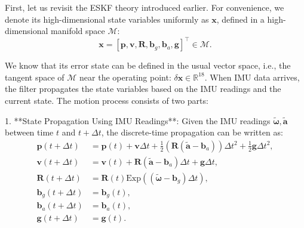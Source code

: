First, let us revisit the ESKF theory introduced earlier. For convenience, we denote its high-dimensional state variables uniformly as $\mathbf{x}$, defined in a high-dimensional manifold space $\mathcal{M}$:  
\begin{equation}\label{eq:def-of-state-variable}  
	\mathbf{x} = [\mathbf{p}, \mathbf{v}, \mathbf{R}, \mathbf{b}_g, \mathbf{b}_a, \mathbf{g}]^\top \in \mathcal{M}.  
\end{equation}  

We know that its error state can be defined in the usual vector space, i.e., the tangent space of $\mathcal{M}$ near the operating point: $\delta \mathbf{x} \in \mathbb{R}^{18}$. When IMU data arrives, the filter propagates the state variables based on the IMU readings and the current state. The motion process consists of two parts:  

1. **State Propagation Using IMU Readings**: Given the IMU readings $\tilde{\boldsymbol{\omega}}, \tilde{\mathbf{a}}$ between time $t$ and $t+\Delta t$, the discrete-time propagation can be written as:  
\begin{subequations}\label{key}  
	\begin{align}  
		\mathbf{p}(t+\Delta t) &= \mathbf{p}(t) + \mathbf{v} \Delta t + \frac{1}{2}   
		\left(\mathbf{R}(\tilde{\mathbf{a}}-\mathbf{b}_a) \right) \Delta t^2 + \frac{1}{2} \mathbf{g} \Delta t^2, \\  
		\mathbf{v}(t+\Delta t) &= \mathbf{v}(t) + \mathbf{R} (\tilde{\mathbf{a}} - \mathbf{b}_a) \Delta t + \mathbf{g} \Delta t, \\  
		\mathbf{R}(t+\Delta t) &= \mathbf{R}(t) \mathrm{Exp} \left( (\tilde{\boldsymbol{\omega}}-\mathbf{b}_g)   
		\Delta t \right), \\  
		\mathbf{b}_g(t+\Delta t) &= \mathbf{b}_g(t), \\  
		\mathbf{b}_a(t+\Delta t) &= \mathbf{b}_a(t), \\  
		\mathbf{g}(t+\Delta t) &= \mathbf{g}(t) .  
	\end{align}  
\end{subequations}  

